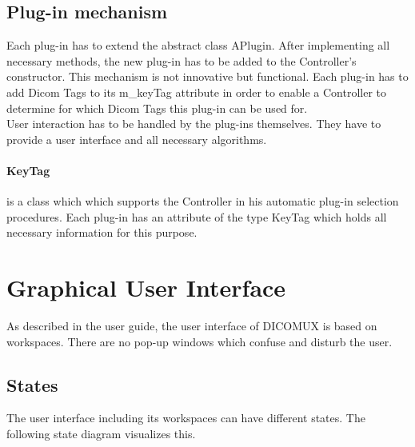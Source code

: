 \subsection{Plug-in mechanism}
Each plug-in has to extend the abstract class APlugin. After implementing all necessary methods, the new plug-in has to be added to the Controller's constructor. This mechanism is not innovative but functional. Each plug-in has to add Dicom Tags to its m\_keyTag attribute in order to enable a Controller to determine for which Dicom Tags this plug-in can be used for.\\
User interaction has to be handled by the plug-ins themselves. They have to provide a user interface and all necessary algorithms. 
\paragraph{KeyTag} is a class which which supports the Controller in his automatic plug-in selection procedures. Each plug-in has an attribute of the type KeyTag which holds all necessary information for this purpose.

\section{Graphical User Interface}
As described in the user guide, the user interface of DICOMUX is based on workspaces. There are no pop-up windows which confuse and disturb the user.

\subsection{States}
The user interface including its workspaces can have different states. The following state diagram visualizes this.

		\begin{minipage}{\textwidth} 
		\centering
		\label{fig:bild}
		\end{minipage}

%
%